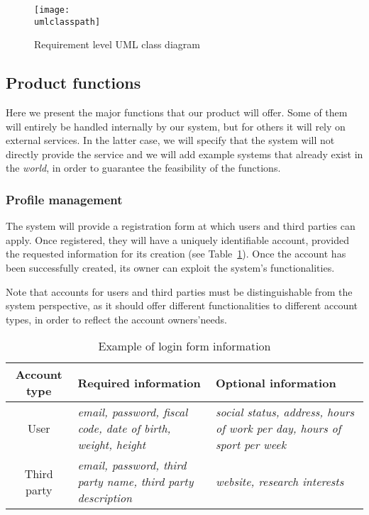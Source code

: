     \begin{figure}[h!]
      \centering
      \texttt{[image: \\umlclasspath]}
      \caption{Requirement level UML class diagram}
      \label{fig:umlclass}
    \end{figure}

  \subsection{Product functions}

    Here we present the major functions that our product will offer. Some of them will entirely be handled internally by our system, but for others it will rely on external services. In the latter case, we will specify that the system will not directly provide the service and we will add example systems that already exist in the \textit{world}, in order to guarantee the feasibility of the functions.

    \subsubsection{Profile management}

      The system will provide a registration form at which users and third parties can apply. Once registered, they will have a uniquely identifiable account, provided the requested information for its creation (see Table~\ref{tab:login}). Once the account has been successfully created, its owner can exploit the system's functionalities.

      Note that accounts for users and third parties must be distinguishable from the system perspective, as it should offer different functionalities to different account types, in order to reflect the account owners'needs.

      \begin{table}[h!]
        \centering
        \begin{tabularx}{\linewidth}{|c|X|X|}
          \hline
          \textbf{Account type} & \textbf{Required information}                                       & \textbf{Optional information}                                                   \\ \hline
          User                  & \textit{email, password, fiscal code, date of birth, weight, height}             & \textit{social status, address, hours of work per day, hours of sport per week} \\ \hline
          Third party           & \textit{email, password, third party name, third party description} & \textit{website, research interests}                                            \\ \hline
        \end{tabularx}
        \caption{Example of login form information}
        \label{tab:login}
      \end{table}

